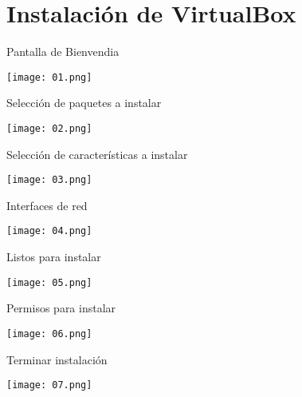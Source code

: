 
\section{Instalación de VirtualBox}

\begin{frame}[c]{Pantalla de Bienvendia}
  \begin{center}
    \texttt{[image: 01.png]}
  \end{center}
\end{frame}

\begin{frame}[c]{Selección de paquetes a instalar}
  \begin{center}
    \texttt{[image: 02.png]}
  \end{center}
\end{frame}

\begin{frame}[c]{Selección de características a instalar}
  \begin{center}
    \texttt{[image: 03.png]}
  \end{center}
\end{frame}

\begin{frame}[c]{Interfaces de red}
  \begin{center}
    \texttt{[image: 04.png]}
  \end{center}
\end{frame}

\begin{frame}[c]{Listos para instalar}
  \begin{center}
    \texttt{[image: 05.png]}
  \end{center}
\end{frame}

\begin{frame}[c]{Permisos para instalar}
  \begin{center}
    \texttt{[image: 06.png]}
  \end{center}
\end{frame}

\begin{frame}[c]{Terminar instalación}
  \begin{center}
    \texttt{[image: 07.png]}
  \end{center}
\end{frame}


